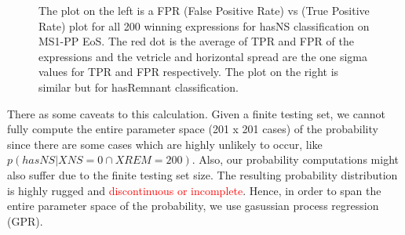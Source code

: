 \begin{figure}[htp]
  \centering
  \quad
  \caption{The plot on the left is a FPR (False Positive Rate) vs (True Positive Rate) plot for all 200 winning expressions for hasNS classification on MS1-PP EoS. The red dot is the average of TPR and FPR of the expressions and the vetricle and horizontal spread are the one sigma values for TPR and FPR respectively. The plot on the right is similar but for hasRemnant classification.  }
  \label{fig:FPR_TPR}
\end{figure}

There as some caveats to this calculation. Given a finite testing set, we cannot fully compute the entire parameter space (201 x 201 cases) of the probability since there are some cases which are highly unlikely to occur, like $p(hasNS | XNS=0 \cap XREM=200)$. Also, our probability computations might also suffer due to the finite testing set size. The resulting probability distribution is highly rugged and \textcolor{red}{discontinuous or incomplete}. Hence, in order to span the entire parameter space of the probability, we use gasussian process regression (GPR). 

